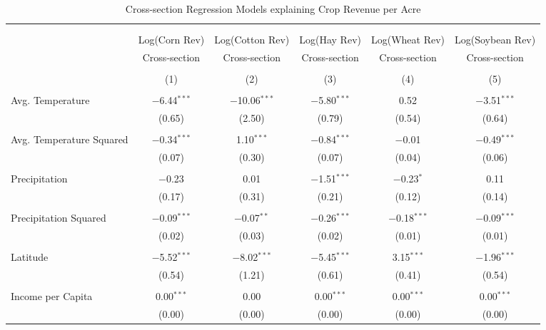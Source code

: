 \documentclass[10pt]{article}
\begin{document}
\begin{table}[!htbp] \centering 
  \caption{Cross-section Regression Models explaining Crop Revenue per Acre} 
  \label{} 
\footnotesize 
\begin{tabular}{@{\extracolsep{5pt}}lccccc} 
\\[-1.8ex]\hline 
\hline \\[-1.8ex] 
\\[-1.8ex] & Log(Corn Rev) & Log(Cotton Rev) & Log(Hay Rev) & Log(Wheat Rev) & Log(Soybean Rev) \\ 
 & Cross-section & Cross-section & Cross-section & Cross-section & Cross-section \\ 
\\[-1.8ex] & (1) & (2) & (3) & (4) & (5)\\ 
\hline \\[-1.8ex] 
 Avg. Temperature & $-$6.44$^{***}$ & $-$10.06$^{***}$ & $-$5.80$^{***}$ & 0.52 & $-$3.51$^{***}$ \\ 
  & (0.65) & (2.50) & (0.79) & (0.54) & (0.64) \\ 
  & & & & & \\ 
 Avg. Temperature Squared & $-$0.34$^{***}$ & 1.10$^{***}$ & $-$0.84$^{***}$ & $-$0.01 & $-$0.49$^{***}$ \\ 
  & (0.07) & (0.30) & (0.07) & (0.04) & (0.06) \\ 
  & & & & & \\ 
 Precipitation & $-$0.23 & 0.01 & $-$1.51$^{***}$ & $-$0.23$^{*}$ & 0.11 \\ 
  & (0.17) & (0.31) & (0.21) & (0.12) & (0.14) \\ 
  & & & & & \\ 
 Precipitation Squared & $-$0.09$^{***}$ & $-$0.07$^{**}$ & $-$0.26$^{***}$ & $-$0.18$^{***}$ & $-$0.09$^{***}$ \\ 
  & (0.02) & (0.03) & (0.02) & (0.01) & (0.01) \\ 
  & & & & & \\ 
 Latitude & $-$5.52$^{***}$ & $-$8.02$^{***}$ & $-$5.45$^{***}$ & 3.15$^{***}$ & $-$1.96$^{***}$ \\ 
  & (0.54) & (1.21) & (0.61) & (0.41) & (0.54) \\ 
  & & & & & \\ 
 Income per Capita & 0.00$^{***}$ & 0.00 & 0.00$^{***}$ & 0.00$^{***}$ & 0.00$^{***}$ \\ 
  & (0.00) & (0.00) & (0.00) & (0.00) & (0.00) \\ 

\end{tabular}
\end{table}
\end{document}
